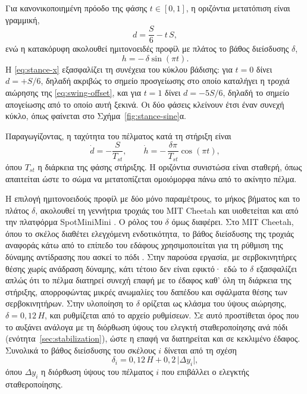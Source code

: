 \documentclass[11pt]{report}
\begin{document}
Για κανονικοποιημένη πρόοδο της φάσης $t \in [0,1]$, η οριζόντια μετατόπιση
είναι γραμμική,
\begin{equation}
d = \frac{S}{6} - t\,S,
\label{eq:stance-x}
\end{equation}
ενώ η κατακόρυφη ακολουθεί ημιτονοειδές προφίλ με πλάτος το βάθος διείσδυσης
$\delta$,
\begin{equation}
h = -\,\delta \sin(\pi t).
\label{eq:stance-y}
\end{equation}
Η \eqref{eq:stance-x} εξασφαλίζει τη συνέχεια του κύκλου βάδισης: για $t = 0$
δίνει $d = +S/6$, δηλαδή ακριβώς το σημείο προσγείωσης στο οποίο καταλήγει η
τροχιά αιώρησης της \eqref{eq:swing-offset}, και για $t = 1$ δίνει $d = -5S/6$,
δηλαδή το σημείο απογείωσης από το οποίο αυτή ξεκινά. Οι δύο φάσεις κλείνουν
έτσι έναν συνεχή κύκλο, όπως φαίνεται στο
Σχήμα~\ref{fig:stance-sine}α.

Παραγωγίζοντας, η ταχύτητα του πέλματος κατά τη στήριξη είναι
\begin{equation}
\dot{d} = -\frac{S}{T_{st}}, \qquad
\dot{h} = -\,\frac{\delta \pi}{T_{st}} \cos(\pi t),
\label{eq:stance-vel}
\end{equation}
όπου $T_{st}$ η διάρκεια της φάσης στήριξης. Η οριζόντια συνιστώσα είναι
σταθερή, όπως απαιτείται ώστε το σώμα να μετατοπίζεται ομοιόμορφα πάνω από το
ακίνητο πέλμα.

Η επιλογή ημιτονοειδούς προφίλ με δύο μόνο παραμέτρους, το μήκος βήματος και το
πλάτος $\delta$, ακολουθεί τη γεννήτρια τροχιάς του MIT Cheetah
\cite{hyun_high_2014} και υιοθετείται και από την πλατφόρμα SpotMiniMini
\cite{spotminimini2020github}. Ο ρόλος του $\delta$ όμως διαφέρει. Στο MIT
Cheetah, όπου το σκέλος διαθέτει ελεγχόμενη ενδοτικότητα, το βάθος διείσδυσης
της τροχιάς αναφοράς κάτω από το επίπεδο του εδάφους χρησιμοποιείται για τη
ρύθμιση της δύναμης αντίδρασης που ασκεί το πόδι \cite{hyun_high_2014}. Στην
παρούσα εργασία, με σερβοκινητήρες θέσης χωρίς ανάδραση δύναμης, κάτι τέτοιο
δεν είναι εφικτό· εδώ το $\delta$ εξασφαλίζει απλώς ότι το πέλμα διατηρεί
συνεχή επαφή με το έδαφος καθ' όλη τη διάρκεια της στήριξης, απορροφώντας
μικρές ανωμαλίες του δαπέδου και σφάλματα θέσης των σερβοκινητήρων. Στην
υλοποίηση το $\delta$ ορίζεται ως κλάσμα του ύψους αιώρησης, $\delta = 0{,}12\,H$,
και ρυθμίζεται από το αρχείο ρυθμίσεων. Σε αυτό προστίθεται όρος που το αυξάνει
ανάλογα με τη διόρθωση ύψους του ελεγκτή σταθεροποίησης ανά πόδι
(ενότητα~\ref{sec:stabilization}), ώστε η επαφή να διατηρείται και σε κεκλιμένο
έδαφος. Συνολικά το βάθος διείσδυσης του σκέλους $i$ δίνεται από τη σχέση
\begin{equation}
\delta_i = 0{,}12\,H + 0{,}2\,\lvert \Delta y_i \rvert,
\label{eq:stance-delta}
\end{equation}
όπου $\Delta y_i$ η διόρθωση ύψους του πέλματος $i$ που επιβάλλει ο ελεγκτής
σταθεροποίησης.
\end{document}
